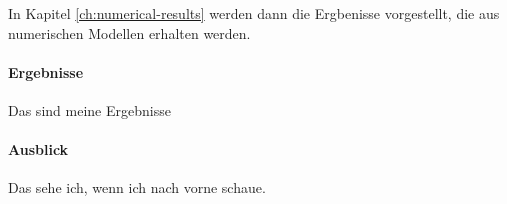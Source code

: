 In Kapitel \ref{ch:numerical-results} werden dann die Ergbenisse vorgestellt, die aus numerischen Modellen erhalten werden. 


\paragraph{Ergebnisse}
Das sind meine Ergebnisse
\paragraph{Ausblick}
Das sehe ich, wenn ich nach vorne schaue.

